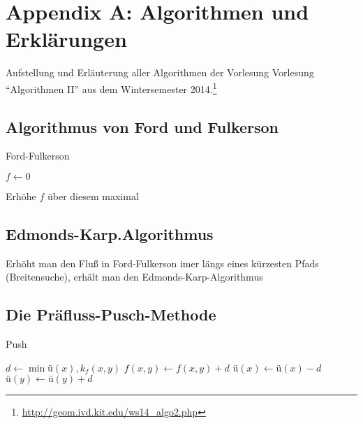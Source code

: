 \section{Appendix A: Algorithmen und Erklärungen}

Aufstellung und Erläuterung aller Algorithmen der Vorlesung Vorlesung "`Algorithmen II"' aus dem Wintersemester 2014.\footnote{\url{http://geom.ivd.kit.edu/ws14_algo2.php}}

\subsection{Algorithmus von Ford und Fulkerson}

\begin{algorithm}[H]
	\caption{Ford-Fulkerson}

	\BlankLine

	$f \longleftarrow 0$

	 {
		Erhöhe $f$ über diesem maximal
	}
\end{algorithm}

\subsection{Edmonds-Karp.Algorithmus}
	Erhöht man den Fluß in Ford-Fulkerson imer längs eines kürzesten Pfads (Breitensuche), erhält man den Edmonds-Karp-Algorithmus
	
\subsection{Die Präfluss-Pusch-Methode}
\begin{algorithm}[H]
	\caption{Push}

	\Output{}
	\BlankLine

	$d \longleftarrow \min{ü(x), k_f(x,y)}$ \newline
	$f(x,y) \longleftarrow f(x,y) +d$ \newline
	$ü(x) \longleftarrow ü(x) -d $ \newline
	$ü(y) \longleftarrow ü(y) +d$ \newline
\end{algorithm}

